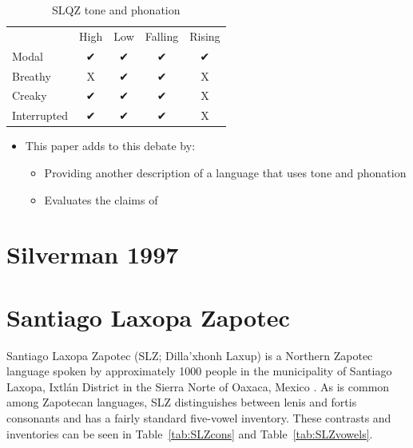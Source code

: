 \documentclass[12pt, letterpaper]{article}
\providecommand{\lsptoprule}{\midrule\toprule}
\providecommand{\lspbottomrule}{\bottomrule\midrule}
\begin{document}
\begin{table}[!ht]
	\centering
	\caption{SLQZ tone and phonation}
	\label{tab:SLQZ}
	 \begin{tabular}{lcccc}
	  \lsptoprule
					  &	 High  & Low & Falling & Rising \\
		  Modal	& ✔︎ & ✔︎ & ✔︎ & ✔︎ \\
		  Breathy & X & ✔︎ & ✔︎ & X \\
		  Creaky & ✔︎ & ✔︎ & ✔︎ & X \\
		  Interrupted & ✔︎ & ✔︎ & ✔︎ & X \\
	  \lspbottomrule
	 \end{tabular}
	\end{table}
\begin{itemize}
	\item This paper adds to this debate by:
	\begin{itemize}
		\item Providing another description of a language that uses tone and phonation
		\item Evaluates the claims of \citet{silvermanLaryngealComplexityOtomanguean1997}
	\end{itemize}
\end{itemize}

\section{Silverman 1997} \label{sec:Silverman}


\section{Santiago Laxopa Zapotec} \label{sec:SLZ}

Santiago Laxopa Zapotec (SLZ; Dilla'xhonh Laxup) is a Northern Zapotec language spoken by approximately 1000 people in the municipality of Santiago Laxopa, Ixtlán District in the Sierra Norte of Oaxaca, Mexico \citep{adlerAcousticsPhonationTypes2016,adlerDerivationVerbInitiality2018,foleyForbiddenCliticClusters2018,foleyExtendingPersonCaseConstraint2020}. As is common among Zapotecan languages, SLZ distinguishes between lenis and fortis consonants \citep[e.g.,][]{nellisFortisLenisCajonos1980,jaegerFortisLenisQuestion1983,uchiharaFortisLenisGlides2016} and has a fairly standard five-vowel inventory. These contrasts and inventories can be seen in Table~\ref{tab:SLZcons} and Table~\ref{tab:SLZvowels}.
\end{document}
